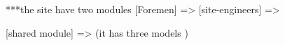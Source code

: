 ***the site have two modules
[Foremen] =>
[site-engineers] =>

[shared module] => (it has three models )





